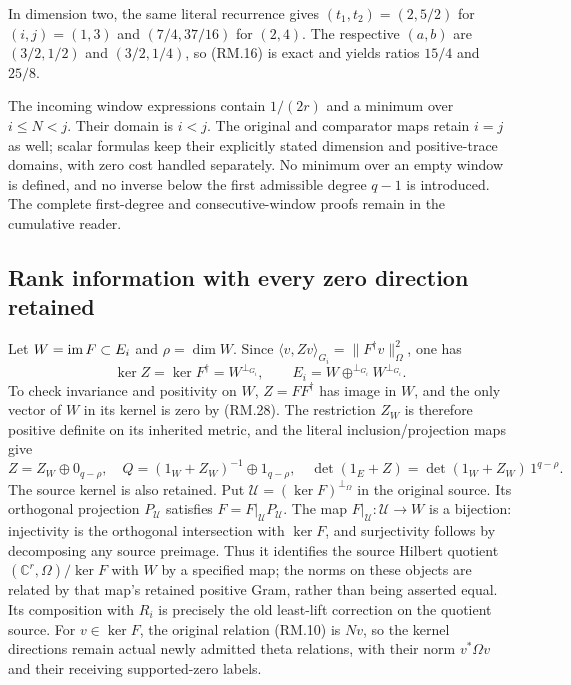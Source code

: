 In dimension two, the same literal recurrence gives $(t_1,t_2)=(2,5/2)$
for $(i,j)=(1,3)$ and $(7/4,37/16)$ for $(2,4)$.
The respective $(a,b)$ are $(3/2,1/2)$ and $(3/2,1/4)$, so (RM.16)
is exact and yields ratios $15/4$ and $25/8$.

The incoming window expressions contain $1/(2r)$ and a minimum over
$i\le N<j$. Their domain is $i<j$. The original and comparator maps
retain $i=j$ as well; scalar formulas keep their explicitly stated dimension
and positive-trace domains, with zero cost handled separately. No minimum
over an empty window is defined, and no
inverse below the first admissible degree $q-1$ is introduced. The complete
first-degree and consecutive-window proofs remain in the cumulative reader.

\subsection{Rank information with every zero direction retained}
Let $W=\operatorname{im} F\subset E_i$ and $\rho=\dim W$. Since
$\langle v,Zv\rangle_{G_i}=\|F^\dagger v\|_\Omega^2$, one has
\begin{equation}
 \ker Z=\ker F^\dagger=W^{\perp_{G_i}},\qquad
 E_i=W\mathbin{\oplus^{\perp_{G_i}}}W^{\perp_{G_i}}.\tag{RM.28}
\end{equation}
To check invariance and positivity on $W$, $Z=FF^\dagger$ has image in
$W$, and the only vector of $W$ in its kernel is zero by (RM.28).
The restriction $Z_W$ is therefore positive definite on its inherited
metric, and the literal inclusion/projection maps give
\begin{equation}
 Z=Z_W\oplus0_{q-\rho},\quad
 Q=(1_W+Z_W)^{-1}\oplus1_{q-\rho},\quad
 \det(1_E+Z)=\det(1_W+Z_W)\,1^{q-\rho}.\tag{RM.29}
\end{equation}
The source kernel is also retained. Put
$\mathcal U=(\ker F)^{\perp_\Omega}$ in the original source.
Its orthogonal projection $P_{\mathcal U}$ satisfies
$F=F|_{\mathcal U}P_{\mathcal U}$. The map
$F|_{\mathcal U}:\mathcal U\to W$ is a bijection: injectivity is the
orthogonal intersection with $\ker F$, and surjectivity follows by
decomposing any source preimage. Thus it identifies the source Hilbert
quotient $(\mathbb C^r,\Omega)/\ker F$ with $W$ by a specified map;
the norms on these objects are related by that map's retained positive
Gram, rather than being asserted equal. Its composition with $R_i$
is precisely the old least-lift correction on the quotient source.
For $v\in\ker F$, the original relation (RM.10) is $Nv$, so the kernel
directions remain actual newly admitted theta relations, with their norm
$v^*\Omega v$ and their receiving supported-zero labels.

